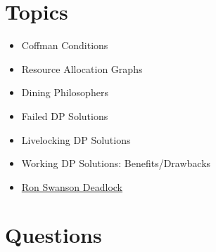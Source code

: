 \section{Topics}

\begin{itemize}
  \item Coffman Conditions
  \item Resource Allocation Graphs
  \item Dining Philosophers
  \item Failed DP Solutions
  \item Livelocking DP Solutions
  \item Working DP Solutions: Benefits/Drawbacks
  \item \href{http://adit.io/posts/2013-05-11-The-Dining-Philosophers-Problem-With-Ron-Swanson.html}{Ron Swanson Deadlock}
\end{itemize}

\section{Questions}

